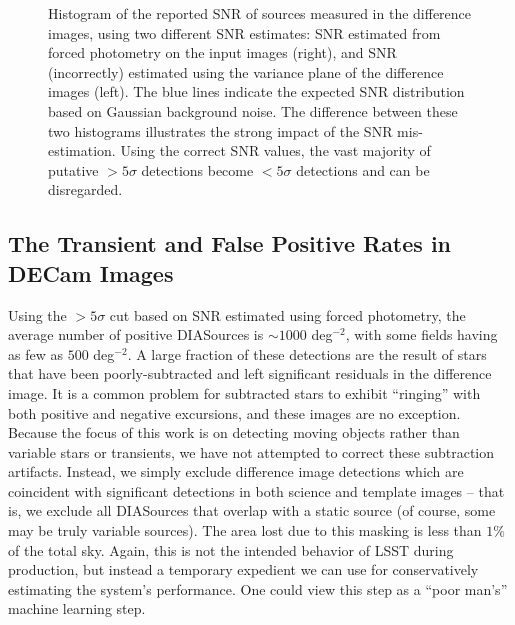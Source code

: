 \begin{figure}
  \centering
  \caption{
  Histogram of the reported SNR of sources measured in the difference images, 
  using two different SNR estimates: SNR estimated from forced photometry on
  the input images (right), and SNR (incorrectly) estimated using the variance plane
  of the difference images (left). The blue lines indicate the expected SNR distribution
  based on Gaussian background noise. The difference between these two histograms
  illustrates the strong impact of the SNR mis-estimation. Using the correct SNR values, 
  the vast majority of putative $>5 \sigma$ detections become $<5 \sigma$ detections
  and can be disregarded.
  }
  \label{fig:snr_comparison}
\end{figure}


\subsection{The Transient and False Positive Rates in DECam Images} 

Using the $>5\sigma$ cut based on SNR estimated using forced photometry, 
the average number of positive DIASources is $\sim 1000$ deg$^{-2}$,
with some fields having as few as $500$ deg$^{-2}$. A large fraction of
these detections are the result of stars that have been poorly-subtracted and
left significant residuals in the difference image. It is a common problem for
subtracted stars to exhibit ``ringing'' with both positive and negative
excursions, and these images are no exception. Because the focus of this work
is on detecting moving objects rather than variable stars or transients, we have
not attempted to correct these subtraction artifacts. Instead, we simply exclude
difference image detections which are coincident with significant detections in
both science and template images -- that is, we exclude all DIASources that
overlap with a static source (of course, some may be truly variable sources). 
The area lost due to this masking is less than $1\%$ of the total sky. Again, this 
is not the intended behavior of LSST during production, but instead a temporary 
expedient we can use for conservatively estimating the system's performance. 
One could view this step as a ``poor man's'' machine learning step. 


